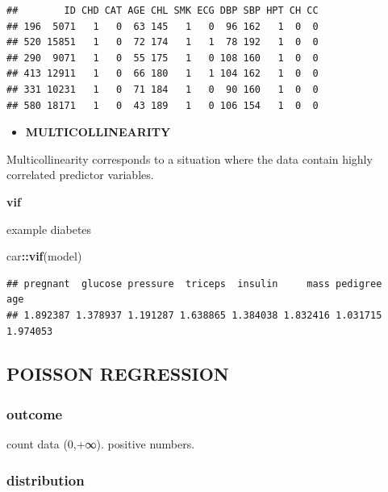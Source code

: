 \documentclass[
]{article}
\newenvironment{Shaded}{\begin{snugshade}}{\end{snugshade}}
\newcommand{\KeywordTok}[1]{\textcolor[rgb]{0.13,0.29,0.53}{\textbf{#1}}}
\newcommand{\NormalTok}[1]{#1}
\newcommand{\OperatorTok}[1]{\textcolor[rgb]{0.81,0.36,0.00}{\textbf{#1}}}
\providecommand{\tightlist}{%
  \setlength{\itemsep}{0pt}\setlength{\parskip}{0pt}}
\begin{document}
\begin{verbatim}
##        ID CHD CAT AGE CHL SMK ECG DBP SBP HPT CH CC
## 196  5071   1   0  63 145   1   0  96 162   1  0  0
## 520 15851   1   0  72 174   1   1  78 192   1  0  0
## 290  9071   1   0  55 175   1   0 108 160   1  0  0
## 413 12911   1   0  66 180   1   1 104 162   1  0  0
## 331 10231   1   0  71 184   1   0  90 160   1  0  0
## 580 18171   1   0  43 189   1   0 106 154   1  0  0
\end{verbatim}

\begin{itemize}
\tightlist
\item
  \textbf{MULTICOLLINEARITY}
\end{itemize}

Multicollinearity corresponds to a situation where the data contain
highly correlated predictor variables.

\textbf{vif}

example diabetes

\begin{Shaded}
\begin{Highlighting}[]
\NormalTok{car}\OperatorTok{::}\KeywordTok{vif}\NormalTok{(model)}
\end{Highlighting}
\end{Shaded}

\begin{verbatim}
## pregnant  glucose pressure  triceps  insulin     mass pedigree      age 
## 1.892387 1.378937 1.191287 1.638865 1.384038 1.832416 1.031715 1.974053
\end{verbatim}

\hypertarget{poisson-regression}{%
\subsection{POISSON REGRESSION}\label{poisson-regression}}

\hypertarget{outcome-2}{%
\subsubsection{outcome}\label{outcome-2}}

count data (0,+∞). positive numbers.

\hypertarget{distribution-2}{%
\subsubsection{distribution}\label{distribution-2}}
\end{document}
